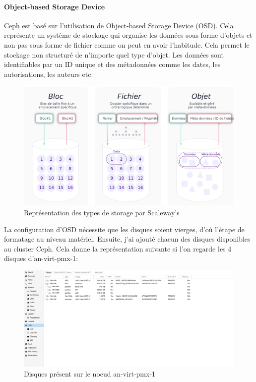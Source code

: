 \documentclass[12pt]{article}
\begin{document}
\paragraph{Object-based Storage Device}
Ceph est basé sur l'utilisation de Object-based Storage Device (OSD).
Cela représente un système de stockage qui organise les données sous forme d'objets et non pas sous forme de fichier comme on peut en avoir l'habitude.
Cela permet le stockage non structuré de n'importe quel type d'objet.
Les données sont identifiables par un ID unique et des métadonnées comme les dates, les autorisations, les auteurs etc.

\begin{figure}
    \centering
        \includegraphics[width=\textwidth]{src/types-de-storage.jpeg}
    \caption{Représentation des types de storage par Scaleway's}
    \label{fig:storage_types}
\end{figure}

La configuration d'OSD nécessite que les disques soient vierges, d'où l'étape de formatage au niveau matériel.
Ensuite, j'ai ajouté chacun des disques disponibles au cluster Ceph.
Cela donne la représentation suivante si l'on regarde les 4 disques d'an-virt-pmx-1:

\begin{figure}
    \centering
        \includegraphics[width=\textwidth]{src/disk_node1.png}
    \caption{Disques présent sur le noeud an-virt-pmx-1}
    \label{fig:disk_node1}
\end{figure}
\end{document}

